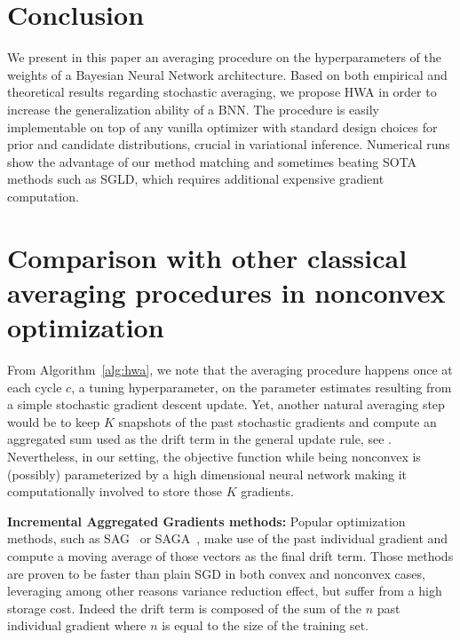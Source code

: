 \documentclass[tablecaption=bottom,wcp]{jmlr} %
\begin{document}
\section{Conclusion}\label{sec:conclusion}
We present in this paper an averaging procedure on the hyperparameters of the weights of a Bayesian Neural Network architecture.
Based on both empirical and theoretical results regarding stochastic averaging, we propose HWA in order to increase the generalization ability of a BNN.
The procedure is easily implementable on top of any vanilla optimizer with standard design choices for prior and candidate distributions, crucial in variational inference.
Numerical runs show the advantage of our method matching and sometimes beating SOTA methods such as SGLD, which requires additional expensive gradient computation.


\clearpage



\clearpage
\appendix

  \hsize\textwidth
  \linewidth\hsize {}
 \bottomtitlebar 
 
\section{Comparison with other classical averaging procedures in nonconvex optimization}
From Algorithm~\ref{alg:hwa}, we note that the averaging procedure happens once at each cycle $c$, a tuning hyperparameter, on the parameter estimates resulting from a simple stochastic gradient descent update.
Yet, another natural averaging step would be to keep $K$ snapshots of the past stochastic gradients and compute an aggregated sum used as the drift term in the general update rule, see \citep{zhou2017convergence}.
Nevertheless, in our setting, the objective function while being nonconvex is (possibly) parameterized by a high dimensional neural network making it computationally involved to store those $K$ gradients.


\textbf{Incremental Aggregated Gradients methods:} Popular optimization methods, such as SAG~\citep{schmidt2017minimizing} or SAGA~\citep{defazio2014saga}, make use of the past individual gradient and compute a moving average of those vectors as the final drift term. Those methods are proven to be faster than plain SGD in both convex and nonconvex cases, leveraging among other reasons variance reduction effect, but suffer from a high storage cost. Indeed the drift term is composed of the sum of the $n$ past individual gradient where $n$ is equal to the size of the training set.
\end{document}
